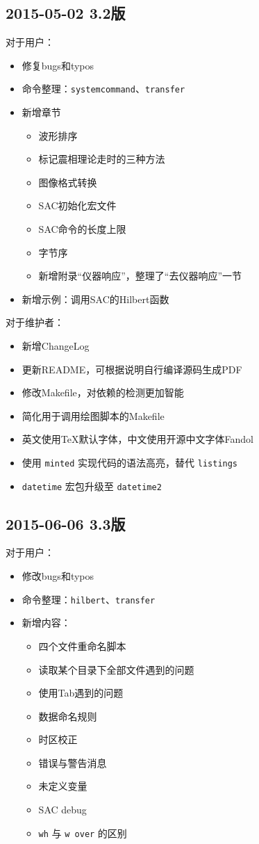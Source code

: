 \subsection*{2015-05-02 3.2版}
对于用户：
\begin{itemize}
\item 修复bugs和typos
\item 命令整理：\texttt{systemcommand}、\texttt{transfer}
\item 新增章节
    \begin{itemize}
    \item 波形排序
    \item 标记震相理论走时的三种方法
    \item 图像格式转换
    \item SAC初始化宏文件
    \item SAC命令的长度上限
    \item 字节序
    \item 新增附录``仪器响应''，整理了``去仪器响应''一节
    \end{itemize}
\item 新增示例：调用SAC的Hilbert函数
\end{itemize}

对于维护者：
\begin{itemize}
\item 新增ChangeLog
\item 更新README，可根据说明自行编译源码生成PDF
\item 修改Makefile，对依赖的检测更加智能
\item 简化用于调用绘图脚本的Makefile
\item 英文使用TeX默认字体，中文使用开源中文字体Fandol
\item 使用 \texttt{minted} 实现代码的语法高亮，替代 \texttt{listings}
\item \texttt{datetime} 宏包升级至 \texttt{datetime2}
\end{itemize}

\subsection*{2015-06-06 3.3版}
对于用户：
\begin{itemize}
\item 修改bugs和typos
\item 命令整理：\texttt{hilbert}、\texttt{transfer}
\item 新增内容：
    \begin{itemize}
    \item 四个文件重命名脚本
    \item 读取某个目录下全部文件遇到的问题
    \item 使用Tab遇到的问题
    \item 数据命名规则
    \item 时区校正
    \item 错误与警告消息
    \item 未定义变量
    \item SAC debug
    \item \texttt{wh} 与 \texttt{w over} 的区别
    \end{itemize}
\end{itemize}

